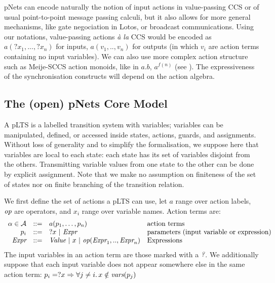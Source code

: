 \documentclass{lncs/llncs}
\def\AlgA{\mathcal{A}}
\begin{document}
pNets can encode naturally the notion of input actions in value-passing CCS
\cite{Milner89} or of usual point-to-point message passing calculi, but it also allows
for more general mechanisms, like gate negociation in Lotos, or broadcast
communications. Using our notations, value-passing actions \emph{\`a la} CCS would be
encoded as $a(?x_1,...,?x_n)$ for inputs, $a(v_1,..,v_n)$ for outputs (in which $v_i$ are 
action terms containing no input variables). 
We can also use more complex action structure such as Meije-SCCS action
monoids, like in $a.b$, $a^{f(n)}$ (see \cite{deSimone85}). The expressiveness of the synchronisation constructs
will depend on the action algebra.




\subsection{The (open) pNets Core Model}
\label{section:pNets}


A pLTS is a labelled transition system with variables; variables can be
manipulated, defined, or accessed inside states, actions, guards, and
assignments. Without loss of generality and to simplify the formalisation, we suppose 
here that 
variables are local to each 
state: each state has its set of variables disjoint from the others. Transmitting 
variable values from one state to the other can be done by explicit assignment. 
Note that we make no assumption on finiteness of the set of states nor
on finite branching of the transition relation.

We first define the set of actions a pLTS can use, let $a$
range over action labels, $\symb{op}$ are operators, and $x_i$ range over
variable names. Action terms are:
\[
\begin{array}[l]{rcl@{\quad}p{5.5cm}}
  \alpha\in\AlgA&::=&a(p_1,\ldots,p_n)&\text{action terms}\\
  p_i&::=& ?x~|~\symb{Expr}&\text{parameters (input variable or expression)}\\
  \symb{Expr}&::=& \symb{Value}~|~x~|~\symb{op}(\symb{Expr}_1,..,\symb{Expr}_n)&\text{Expressions}
\end{array}
\]
The input variables in an action term are those marked with a
$\symb{?}$.
We additionally suppose that each input variable does not
appear somewhere else in the same action term:
$p_i=?x\Rightarrow\forall j\neq i.\, x\notin \vars(p_j)$
\end{document}
